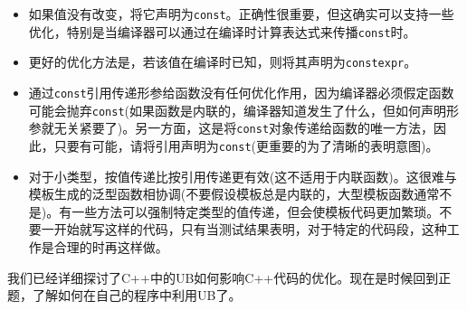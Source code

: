 \begin{itemize}
\item 
如果值没有改变，将它声明为\texttt{const}。正确性很重要，但这确实可以支持一些优化，特别是当编译器可以通过在编译时计算表达式来传播\texttt{const}时。

\item 
更好的优化方法是，若该值在编译时已知，则将其声明为\texttt{constexpr}。

\item 
通过\texttt{const}引用传递形参给函数没有任何优化作用，因为编译器必须假定函数可能会抛弃\texttt{const}(如果函数是内联的，编译器知道发生了什么，但如何声明形参就无关紧要了)。另一方面，这是将\texttt{const}对象传递给函数的唯一方法，因此，只要有可能，请将引用声明为\texttt{const}(更重要的为了清晰的表明意图)。

\item 
对于小类型，按值传递比按引用传递更有效(这不适用于内联函数)。这很难与模板生成的泛型函数相协调(不要假设模板总是内联的，大型模板函数通常不是)。有一些方法可以强制特定类型的值传递，但会使模板代码更加繁琐。不要一开始就写这样的代码，只有当测试结果表明，对于特定的代码段，这种工作是合理的时再这样做。

\end{itemize}

我们已经详细探讨了C++中的UB如何影响C++代码的优化。现在是时候回到正题，了解如何在自己的程序中利用UB了。
























